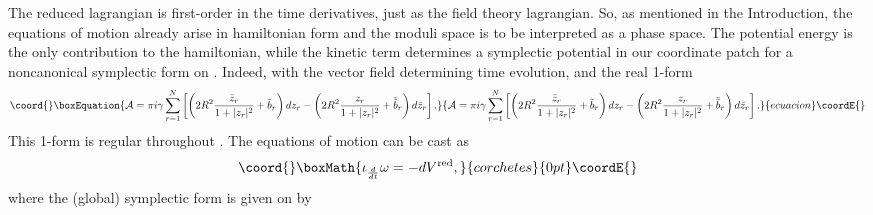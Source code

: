 \documentclass[a4paper,11pt]{article}
\begin{document}
The reduced lagrangian \coordHE{} is
first-order in the time derivatives, just as the field theory
lagrangian. So, as mentioned in the Introduction, 
the equations of motion already arise in hamiltonian form and
the moduli space is to be interpreted as a phase space.
The potential energy \coordHE{} is the only contribution to the
hamiltonian, while the kinetic term determines a symplectic 
potential \coordHE{} in our coordinate patch \coordHE{} for a noncanonical 
symplectic form on \coordHE{}.
Indeed, \coordHE{} with \coordHE{} the
vector field determining time evolution, and \coordHE{} the real 1-form
\begin{equation}\coord{}\boxEquation{\label{unitconn}
{\cal A} = \pi i \gamma \sum_{r=1}^{N} \left[
\left( 2 R^{2}\frac{\bar{z}_{r}}{1+|z_{r}|^{2}}+\tilde{b}_{r}\right)dz_{r}
-\left(
2 R^{2}\frac{{z}_{r}}{1+|z_{r}|^{2}}+\bar{\tilde{b}}_{r}\right)
d\bar{z}_{r}
\right].
}{{\cal A} = \pi i \gamma \sum_{r=1}^{N} \left[
\left( 2 R^{2}\frac{\bar{z}_{r}}{1+|z_{r}|^{2}}+\tilde{b}_{r}\right)dz_{r}
-\left(
2 R^{2}\frac{{z}_{r}}{1+|z_{r}|^{2}}+\bar{\tilde{b}}_{r}\right)
d\bar{z}_{r}
\right].
}{ecuacion}\coordE{}\end{equation}
This 1-form is regular throughout \coordHE{}.
The equations of motion can be cast as
\[\coord{}\boxMath{
\iota_{\frac{d}{dt}}\omega=-dV^{\rm red},
}{corchetes}{0pt}\coordE{}\]
where the (global) symplectic form \coordHE{} is given on \coordHE{} by
\end{document}
